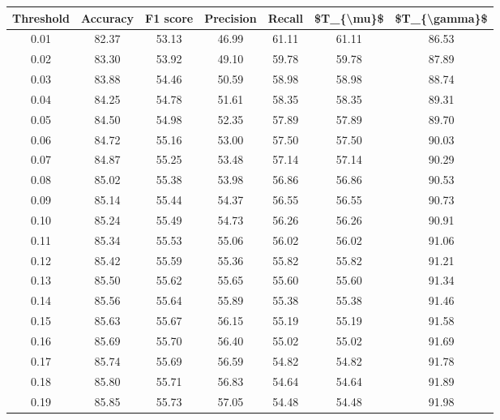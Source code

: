\begin{tabular}{|c|c|c|c|c|c|c|}
\hline
 Threshold &  Accuracy &  F1 score &  Precision &  Recall &  \$T\_\{\textbackslash mu\}\$ &  \$T\_\{\textbackslash gamma\}\$ \\
\hline
      0.01 &     82.37 &     53.13 &      46.99 &   61.11 &      61.11 &         86.53 \\
      0.02 &     83.30 &     53.92 &      49.10 &   59.78 &      59.78 &         87.89 \\
      0.03 &     83.88 &     54.46 &      50.59 &   58.98 &      58.98 &         88.74 \\
      0.04 &     84.25 &     54.78 &      51.61 &   58.35 &      58.35 &         89.31 \\
      0.05 &     84.50 &     54.98 &      52.35 &   57.89 &      57.89 &         89.70 \\
      0.06 &     84.72 &     55.16 &      53.00 &   57.50 &      57.50 &         90.03 \\
      0.07 &     84.87 &     55.25 &      53.48 &   57.14 &      57.14 &         90.29 \\
      0.08 &     85.02 &     55.38 &      53.98 &   56.86 &      56.86 &         90.53 \\
      0.09 &     85.14 &     55.44 &      54.37 &   56.55 &      56.55 &         90.73 \\
      0.10 &     85.24 &     55.49 &      54.73 &   56.26 &      56.26 &         90.91 \\
      0.11 &     85.34 &     55.53 &      55.06 &   56.02 &      56.02 &         91.06 \\
      0.12 &     85.42 &     55.59 &      55.36 &   55.82 &      55.82 &         91.21 \\
      0.13 &     85.50 &     55.62 &      55.65 &   55.60 &      55.60 &         91.34 \\
      0.14 &     85.56 &     55.64 &      55.89 &   55.38 &      55.38 &         91.46 \\
      0.15 &     85.63 &     55.67 &      56.15 &   55.19 &      55.19 &         91.58 \\
      0.16 &     85.69 &     55.70 &      56.40 &   55.02 &      55.02 &         91.69 \\
      0.17 &     85.74 &     55.69 &      56.59 &   54.82 &      54.82 &         91.78 \\
      0.18 &     85.80 &     55.71 &      56.83 &   54.64 &      54.64 &         91.89 \\
      0.19 &     85.85 &     55.73 &      57.05 &   54.48 &      54.48 &         91.98 \\

\end{tabular}

